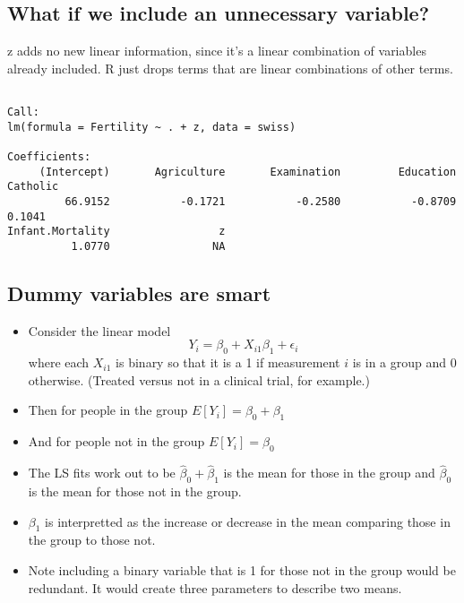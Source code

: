 \documentclass[12pt,]{04-class-files/abntex2}
\newenvironment{Shaded}{\begin{snugshade}}{\end{snugshade}}
\newcommand{\DataTypeTok}[1]{\textcolor[rgb]{0.13,0.29,0.53}{#1}}
\newcommand{\KeywordTok}[1]{\textcolor[rgb]{0.13,0.29,0.53}{\textbf{#1}}}
\newcommand{\NormalTok}[1]{#1}
\newcommand{\OperatorTok}[1]{\textcolor[rgb]{0.81,0.36,0.00}{\textbf{#1}}}
\newcommand{\StringTok}[1]{\textcolor[rgb]{0.31,0.60,0.02}{#1}}
\providecommand{\tightlist}{%
  \setlength{\itemsep}{0pt}\setlength{\parskip}{0pt}}
\begin{document}
\hypertarget{what-if-we-include-an-unnecessary-variable}{%
\subsection{What if we include an unnecessary variable?}\label{what-if-we-include-an-unnecessary-variable}}

z adds no new linear information, since it's a linear
combination of variables already included. R just drops
terms that are linear combinations of other terms.

\begin{Shaded}
\end{Shaded}

\begin{verbatim}

Call:
lm(formula = Fertility ~ . + z, data = swiss)

Coefficients:
     (Intercept)       Agriculture       Examination         Education          Catholic  
         66.9152           -0.1721           -0.2580           -0.8709            0.1041  
Infant.Mortality                 z  
          1.0770                NA  
\end{verbatim}

\hypertarget{dummy-variables-are-smart}{%
\subsection{Dummy variables are smart}\label{dummy-variables-are-smart}}

\begin{itemize}
\tightlist
\item
  Consider the linear model
  \[
  Y_i = \beta_0 + X_{i1} \beta_1 + \epsilon_{i}
  \]
  where each \(X_{i1}\) is binary so that it is a 1 if measurement \(i\) is in a group and 0 otherwise. (Treated versus not in a clinical trial, for example.)
\item
  Then for people in the group \(E[Y_i] = \beta_0 + \beta_1\)
\item
  And for people not in the group \(E[Y_i] = \beta_0\)
\item
  The LS fits work out to be \(\hat \beta_0 + \hat \beta_1\) is the mean for those in the group and \(\hat \beta_0\) is the mean for those not in the group.
\item
  \(\beta_1\) is interpretted as the increase or decrease in the mean comparing those in the group to those not.
\item
  Note including a binary variable that is 1 for those not in the group would be redundant. It would create three parameters to describe two means.
\end{itemize}
\end{document}
